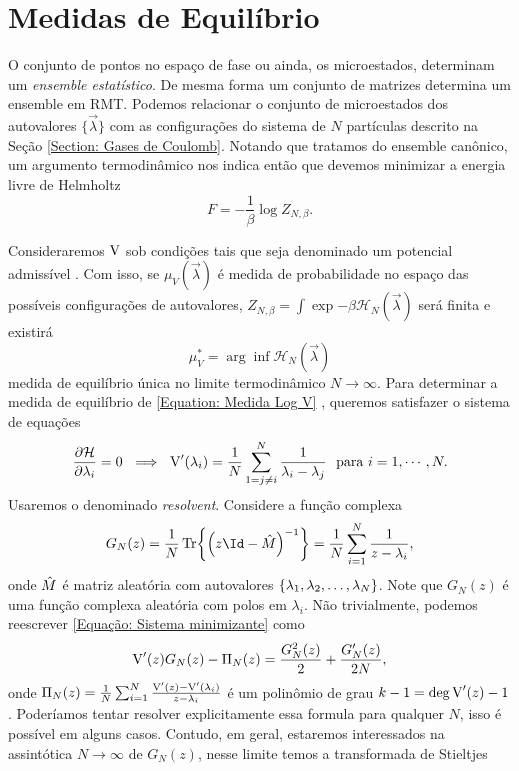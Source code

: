 \section{Medidas de Equilíbrio}
\label{Seção: Medida}
O conjunto de pontos no espaço de fase ou ainda, os microestados, determinam um \textit{ensemble estatístico}. De mesma forma um conjunto de matrizes determina um ensemble em RMT. Podemos relacionar o conjunto de microestados dos autovalores $\{\vec{\lambda}\}$ com as configurações do sistema de $N$ partículas descrito na Seção \ref{Section: Gases de Coulomb}. Notando que tratamos do ensemble canônico, um argumento termodinâmico nos indica então que devemos minimizar a energia livre de Helmholtz $$F = -\frac{1}{\beta} \log{Z_{N, \beta}}.$$ 

Consideraremos $\operatorname{V}$ sob condições tais que seja denominado um potencial admissível \cite{ChafaCoulombMeasure}. Com isso, se $\mu_{V}(\vec{\lambda})$ é medida de probabilidade no espaço das possíveis configurações de autovalores, $Z_{N, \beta} = \int \exp{-\beta \mathcal{H}_N(\vec{\lambda})}$ será finita e existirá $$\mu_{V}^* = \arg \inf {\mathcal{H}_N(\vec{\lambda})}$$ medida de equilíbrio única no limite termodinâmico $N \rightarrow \infty$. Para determinar a medida de equilíbrio de \ref{Equation: Medida Log V} \cite{RMT-firstcourse-Potters}, queremos satisfazer o sistema de equações
\begin{equation}
	\frac{\partial \mathcal{H}}{\partial \lambda_i} = 0 \ \implies \ \operatorname{V}'(\lambda_i) = \frac{1}{N} \sum_{1 = j \neq i}^{N} \frac{1}{\lambda_i - \lambda_j} \ \ \text{para} \ i = 1, \cdots, N.
	\label{Equação: Sistema minimizante}
\end{equation} 
Usaremos o denominado \textit{resolvent}. Considere a função complexa $$G_N(z) = \frac{1}{N} \Tr{\left(z\Id - \matriz{M}\right)^{-1}} = \frac{1}{N} \sum_{i=1}^{N} \frac{1}{z - \lambda_i},$$ onde $\hat M$ é matriz aleatória com autovalores $\{\lambda_1, \lambda_2, \dots, \lambda_N\}$. Note que $G_N(z)$ é uma função complexa aleatória com polos em $\lambda_i$. Não trivialmente, podemos reescrever \ref{Equação: Sistema minimizante} como $$\operatorname{V}'(z) G_N(z) - \Pi_N(z) = \frac{G_N^2(z)}{2} + \frac{G'_N(z)}{2N},$$ onde $\Pi_N(z) = \frac{1}{N} \sum_{i = 1}^{N} \frac{\operatorname{V}'(z) - \operatorname{V}'(\lambda_i)}{z - \lambda_i}$ é um polinômio de grau $k - 1 = \deg{\operatorname{V}'(z)} - 1$. 
Poderíamos tentar resolver explicitamente essa formula para qualquer $N$, isso é possível em alguns casos. Contudo, em geral, estaremos interessados na assintótica $N \to \infty$ de $G_N(z)$, nesse limite temos a transformada de Stieltjes
